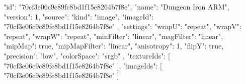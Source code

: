 {
  "id": "70cf3e06c9c89fc8bd1f15e8264b7f8e",
  "name": "Dungeon Iron ARM",
  "version": 1,
  "source": {
    "kind": "image",
    "imageId": "70cf3e06c9c89fc8bd1f15e8264b7f8e"
  },
  "settings": {
    "wrapU": "repeat",
    "wrapV": "repeat",
    "wrapW": "repeat",
    "minFilter": "linear",
    "magFilter": "linear",
    "mipMap": true,
    "mipMapFilter": "linear",
    "anisotropy": 1,
    "flipY": true,
    "precision": "low",
    "colorSpace": "srgb"
  },
  "textureIds": [
    "70cf3e06c9c89fc8bd1f15e8264b7f8e"
  ],
  "imageIds": [
    "70cf3e06c9c89fc8bd1f15e8264b7f8e"
  ]
}
